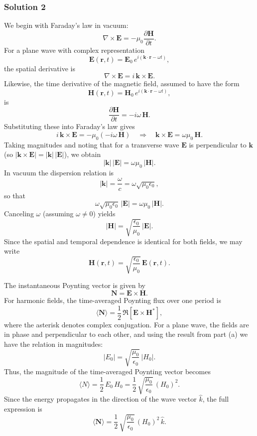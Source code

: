 \documentclass{article}
\begin{document}
\subsubsection{Solution 2}
We begin with Faraday’s law in vacuum:
\[
\nabla \times \mathbf{E} = -\mu_0 \frac{\partial \mathbf{H}}{\partial t}.
\]
For a plane wave with complex representation
\[
\mathbf{E}(\mathbf{r},t) = \mathbf{E}_0\,e^{i(\mathbf{k}\cdot\mathbf{r}-\omega t)},
\]
the spatial derivative is
\[
\nabla \times \mathbf{E} = i\,\mathbf{k} \times \mathbf{E}.
\]
Likewise, the time derivative of the magnetic field, assumed to have the form
\[
\mathbf{H}(\mathbf{r},t) = \mathbf{H}_0\,e^{i(\mathbf{k}\cdot\mathbf{r}-\omega t)},
\]
is
\[
\frac{\partial \mathbf{H}}{\partial t} = -i\omega\,\mathbf{H}.
\]
Substituting these into Faraday’s law gives
\[
i\,\mathbf{k} \times \mathbf{E} = -\mu_0(-i\omega\,\mathbf{H}) \quad \Longrightarrow \quad \mathbf{k} \times \mathbf{E} = \omega\mu_0\,\mathbf{H}.
\]
Taking magnitudes and noting that for a transverse wave \(\mathbf{E}\) is perpendicular to \(\mathbf{k}\) (so \(|\mathbf{k}\times \mathbf{E}| = |\mathbf{k}|\,|\mathbf{E}|\)), we obtain
\[
|\mathbf{k}|\,|\mathbf{E}| = \omega\mu_0\,|\mathbf{H}|.
\]
In vacuum the dispersion relation is
\[
|\mathbf{k}| = \frac{\omega}{c} = \omega\sqrt{\mu_0\epsilon_0},
\]
so that
\[
\omega\sqrt{\mu_0\epsilon_0}\,|\mathbf{E}| = \omega\mu_0\,|\mathbf{H}|.
\]
Canceling \(\omega\) (assuming \(\omega\neq0\)) yields
\[
|\mathbf{H}| = \sqrt{\frac{\epsilon_0}{\mu_0}}\,|\mathbf{E}|.
\]
Since the spatial and temporal dependence is identical for both fields, we may write
\[
\mathbf{H}(\mathbf{r},t) = \sqrt{\frac{\epsilon_0}{\mu_0}}\,\mathbf{E}(\mathbf{r},t).
\]

The instantaneous Poynting vector is given by
\[
\mathbf{N} = \mathbf{E} \times \mathbf{H}.
\]
For harmonic fields, the time-averaged Poynting flux over one period is
\[
\langle \mathbf{N} \rangle = \frac{1}{2}\,\Re\left[\mathbf{E} \times \mathbf{H}^*\right],
\]
where the asterisk denotes complex conjugation. For a plane wave, the fields are in phase and perpendicular to each other, and using the result from part (a) we have the relation in magnitudes:
\[
|E_0| = \sqrt{\frac{\mu_0}{\epsilon_0}}\,|H_0|.
\]
Thus, the magnitude of the time-averaged Poynting vector becomes
\[
\langle N \rangle = \frac{1}{2}\,E_0\,H_0 = \frac{1}{2}\,\sqrt{\frac{\mu_0}{\epsilon_0}}\,(H_0)^2.
\]
Since the energy propagates in the direction of the wave vector \(\hat{k}\), the full expression is
\[
\langle \mathbf{N} \rangle = \frac{1}{2}\,\sqrt{\frac{\mu_0}{\epsilon_0}}\,(H_0)^2\,\hat{k}.
\]
\end{document}
